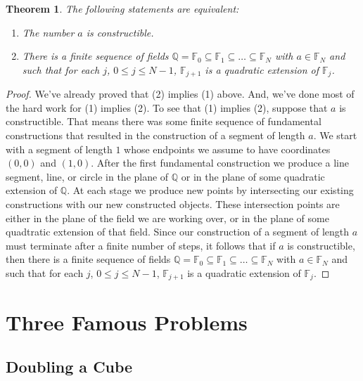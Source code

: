 \documentclass[11pt]{article}
\renewcommand\subset\subseteq
\newtheorem{theorem}{Theorem}[section]
\theoremstyle{definition}
\begin{document}
\begin{theorem}
  The following statements are equivalent:
  \begin{enumerate}
    \item The number $a$ is constructible.
    \item There is a finite sequence of fields $\mathbb{Q} = \mathbb{F}_0 \subset \mathbb{F}_1\subset \dots \subset \mathbb{F}_N$ with
  $a\in\mathbb{F}_N$ and such that for each $j$, $0\leq j \leq N-1$, $\mathbb{F}_{j+1}$ is a quadratic extension of $\mathbb{F}_j$.
  \end{enumerate}
  \label{theorem: constructible iff in sequence of quadratic extensions}
\end{theorem}
\begin{proof}
  We've already proved that (2) implies (1) above. And, we've done most of the hard work for (1) implies (2). To see that (1) implies (2),
  suppose that $a$ is constructible. That means there was some finite sequence of fundamental constructions that resulted in the construction
  of a segment of length $a$. We start with a segment of length $1$ whose endpoints we assume to have coordinates $(0,0)$ and $(1,0)$. After the
  first fundamental construction we produce a line segment, line, or circle in the plane of $\mathbb{Q}$ or in the plane of some
  quadratic extension of $\mathbb{Q}$. At each stage we produce new points by intersecting our existing constructions with our new constructed
  objects. These intersection points are either in the plane of the field we are working over, or in the plane of some quadtratic extension of that
  field. Since our construction of a segment of length $a$ must terminate after a finite number of steps, it follows that if $a$ is constructible,
  then there is a finite sequence of fields $\mathbb{Q} = \mathbb{F}_0 \subset \mathbb{F}_1\subset \dots \subset \mathbb{F}_N$ with
  $a\in\mathbb{F}_N$ and such that for each $j$, $0\leq j \leq N-1$, $\mathbb{F}_{j+1}$ is a quadratic extension of $\mathbb{F}_j$.
\end{proof}

\section{Three Famous Problems}

\subsection{Doubling a Cube}
\end{document}
